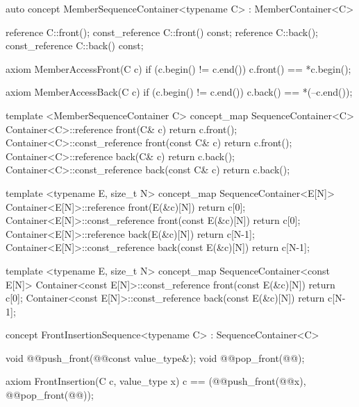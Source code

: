 \documentclass[american,twoside]{book}
\begin{document}
\begin{itemdecl}
auto concept MemberSequenceContainer<typename C> : MemberContainer<C> {
  reference       C::front();
  const_reference C::front() const;
  reference       C::back();
  const_reference C::back() const;

  axiom MemberAccessFront(C c) {
    if (c.begin() != c.end()) c.front() == *c.begin();
  }  

  axiom MemberAccessBack(C c) {
    if (c.begin() != c.end()) c.back() == *(--c.end());
  }
}
\end{itemdecl}

\begin{itemdecl}
template <MemberSequenceContainer C> 
concept_map SequenceContainer<C> {
  Container<C>::reference front(C& c)             { return c.front(); }
  Container<C>::const_reference front(const C& c) { return c.front(); }
  Container<C>::reference back(C& c)              { return c.back(); }
  Container<C>::const_reference back(const C& c)  { return c.back(); }
}			

\end{itemdecl}

\begin{itemdecl}
template <typename E, size_t N>
concept_map SequenceContainer<E[N]> {
  Container<E[N]>::reference front(E(&c)[N])             { return c[0]; }
  Container<E[N]>::const_reference front(const E(&c)[N]) { return c[0]; }
  Container<E[N]>::reference back(E(&c)[N])              { return c[N-1]; }
  Container<E[N]>::const_reference back(const E(&c)[N])  { return c[N-1]; }
}
\end{itemdecl}

\begin{itemdecl}
template <typename E, size_t N>
concept_map SequenceContainer<const E[N]> {
  Container<const E[N]>::const_reference front(const E(&c)[N]) { return c[0]; }
  Container<const E[N]>::const_reference back(const E(&c)[N])  { return c[N-1]; }
}
\end{itemdecl}

\begin{itemdecl}
concept FrontInsertionSequence<typename C> : SequenceContainer<C> {
  void @@push_front(@@const value_type&);
  void @@pop_front(@@);

  axiom FrontInsertion(C c, value_type x) {
    c == (@@push_front(@@x), @@pop_front(@@));
  }
}
\end{itemdecl}
\end{document}
